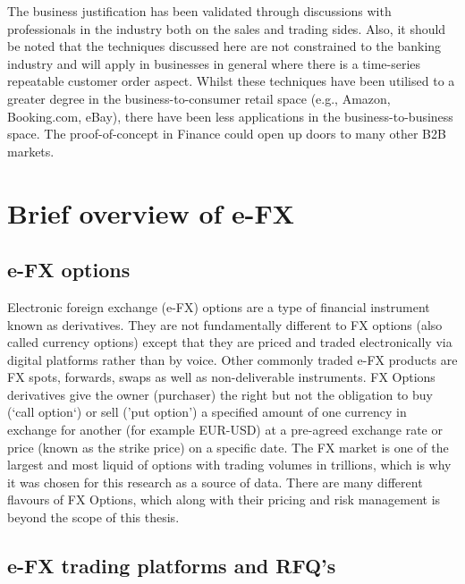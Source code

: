 The business justification has been validated through discussions with professionals in the industry both on the sales and trading sides. Also, it should be noted that the techniques discussed here are not constrained to the banking industry and will apply in businesses in general where there is a time-series repeatable customer order aspect. Whilst these techniques have been utilised to a greater degree in the business-to-consumer retail space (e.g., Amazon, Booking.com, eBay), there have been less applications in the business-to-business space. The proof-of-concept in Finance could open up doors to many other B2B markets.


\section{Brief overview of e-FX}\label{Ch1Sec3}

\subsection{e-FX options}\label{Ch1Sec3S1}

Electronic foreign exchange (e-FX) options are a type of financial instrument known as derivatives. They are not fundamentally different to FX options (also called currency options) except that they are priced and traded electronically via digital platforms rather than by voice.
Other commonly traded e-FX products are FX spots, forwards, swaps as well as non-deliverable instruments. FX Options derivatives give the owner (purchaser) the right but not the obligation to buy (`call option`) or sell ('put option') a specified amount of one currency in exchange for another (for example EUR-USD) at a pre-agreed exchange rate or price (known as the strike price) on a specific date. The FX market is one of the largest and most liquid of options with trading volumes in trillions, which is why it was chosen for this research as a source of data. There are many different flavours of FX Options, which along with their pricing and risk management is beyond the scope of this thesis.


\subsection{e-FX trading platforms and RFQ's}\label{Ch1Sec3S1}

